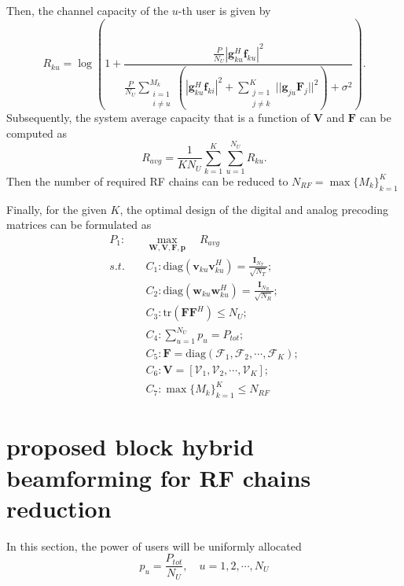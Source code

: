 \documentclass[conference]{IEEEtran}
\begin{document}
Then, the channel capacity of the $u$-th user is given by
\begin{equation}\label{eq:convenR}
R_{ku} = \log\left(1+\frac{\frac{P}{N_U}|{\bm{g}}_{ku}^H \bm{f}_{ku}|^2}{\frac{P}{N_U}\displaystyle\sum_{\substack{i=1 \\ i\neq u}}^{M_k}(|{\bm{g}}_{ku}^H\bm{f}_{ki}|^2+\sum_{\substack{j=1\\j\neq k}}^{K}||\bm{g}_{ju}\bm{F}_j||^2)+\sigma^2}\right).
\end{equation}
Subsequently, the system average capacity that is a function of ${\bm V}$ and ${\bm F}$ can be computed as
\begin{equation}
R_{avg}=\frac{1}{KN_U}\sum_{k=1}^{K}\sum_{u=1}^{N_U}R_{ku}.
\end{equation}
Then the number of required RF chains can be reduced to $N_{RF} = \max \{M_k\}_{k=1}^K $

Finally, for the given $K$, the optimal design of the digital and analog precoding matrices can be formulated as
\begin{align}\label{eq:maxsumrate}
P_1: \quad&\max_{\bm W, \bm V,\bm F, \bm{p}}\quad R_{avg}\\ \nonumber
s.t. \quad&C_1: \text{diag}(\bm{v}_{ku}\bm{v}_{ku}^H)=\frac{\bm{I}_{N_T}}{\sqrt{N_T}};\\
&C_2: \text{diag}(\bm{w}_{ku}\bm{w}_{ku}^H)=\frac{\bm{I}_{N_{R}}}{\sqrt{N_R}};\nonumber\\
&C_3: \text{tr}(\bm{FF}^H) \leq N_U;\nonumber\\
& C_4: \sum_{u=1}^{N_U} p_u = P_{tot};\nonumber\\
&C_5: \bm{F} = \text{diag}(\bm{\mathcal{F}}_1, \bm{\mathcal{F}}_2, \cdots, \bm{\mathcal{F}}_{K});\nonumber\\
&C_6: \bm{V} = [\bm{\mathcal{V}}_1, \bm{\mathcal{V}}_2, \cdots, \bm{\mathcal{V}}_K];\nonumber\\
&C_7: \max \{M_k\}_{k=1}^K \leq N_{RF}\nonumber
\end{align}




\section{proposed block hybrid beamforming for RF chains reduction}
In this section, the power of users will be uniformly allocated
\begin{equation}
p_u = \frac{P_{tot}}{N_U}, \quad u = 1,2,\cdots, N_U
\end{equation}
\end{document}
